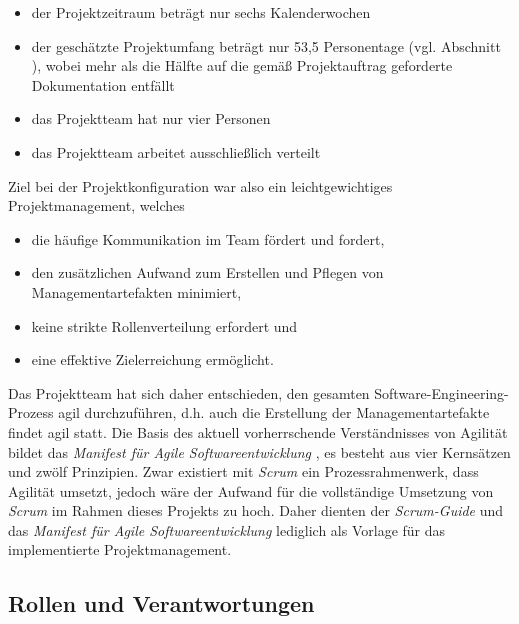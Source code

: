 \documentclass[a4paper,11pt,listof=numbered,glossary=totoc,parskip=half,toc=bib]{scrreprt}
\begin{document}
\begin{itemize}
	\item der Projektzeitraum beträgt nur sechs Kalenderwochen
	\item der geschätzte Projektumfang beträgt nur 53,5 Personentage (vgl. Abschnitt ), wobei mehr als die Hälfte auf die gemäß Projektauftrag geforderte Dokumentation entfällt
	\item das Projektteam hat nur vier Personen
	\item das Projektteam arbeitet ausschließlich verteilt
\end{itemize}

Ziel bei der Projektkonfiguration war also ein leichtgewichtiges Projektmanagement, welches
\begin{itemize}
	\item die häufige Kommunikation im Team fördert und fordert,
	\item den zusätzlichen Aufwand zum Erstellen und Pflegen von Managementartefakten minimiert,
	\item keine strikte Rollenverteilung erfordert und
	\item eine effektive Zielerreichung ermöglicht.
\end{itemize}

Das Projektteam hat sich daher entschieden, den gesamten Software-Engineering-Prozess agil durchzuführen, d.h. auch die Erstellung der Managementartefakte findet agil statt. 
Die Basis des aktuell vorherrschende Verständnisses von Agilität bildet das \textit{Manifest für Agile Softwareentwicklung} \autocite{Agile}, es besteht aus vier Kernsätzen und zwölf Prinzipien. Zwar existiert mit \textit{Scrum} ein Prozessrahmenwerk, dass Agilität umsetzt, jedoch wäre der Aufwand für die vollständige Umsetzung von \textit{Scrum} im Rahmen dieses Projekts zu hoch. Daher dienten der \textit{Scrum-Guide} \autocite{Scrum} und das \textit{Manifest für Agile Softwareentwicklung} lediglich als Vorlage für das implementierte Projektmanagement.


\subsection{Rollen und Verantwortungen}
\end{document}
